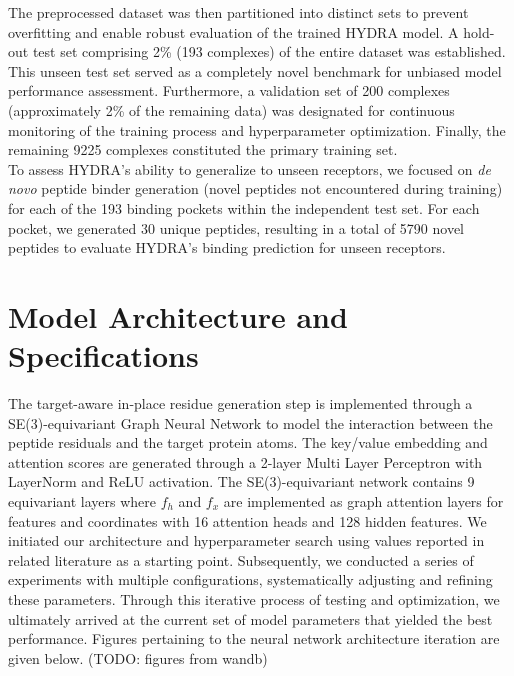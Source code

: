 The preprocessed dataset was then partitioned into distinct sets to prevent overfitting and enable robust evaluation of the trained HYDRA model. A hold-out test set comprising 2\% (193 complexes) of the entire dataset was established. This unseen test set served as a completely novel benchmark for unbiased model performance assessment. Furthermore, a validation set of 200 complexes (approximately 2\% of the remaining data) was designated for continuous monitoring of the training process and hyperparameter optimization. Finally, the remaining 9225 complexes constituted the primary training set. \\

To assess HYDRA's ability to generalize to unseen receptors, we focused on \textit{de novo} peptide binder generation (novel peptides not encountered during training) for each of the 193 binding pockets within the independent test set. For each pocket, we generated 30 unique peptides, resulting in a total of 5790 novel peptides to evaluate HYDRA's binding prediction for unseen receptors.

\section{Model Architecture and Specifications}
The target-aware in-place residue generation step is implemented through a SE(3)-equivariant Graph Neural Network to model the interaction between the peptide residuals and the target protein atoms. The key/value embedding and attention scores are generated through a 2-layer Multi Layer Perceptron with LayerNorm and ReLU activation.
The SE(3)-equivariant network contains 9 equivariant layers where $f_h$ and $f_x$ are implemented as graph attention layers for features and coordinates with 16 attention heads and 128 hidden features. We initiated our architecture and hyperparameter search using values reported in related literature \cite{guan20233d} as a starting point. Subsequently, we conducted a series of experiments with multiple configurations, systematically adjusting and refining these parameters. Through this iterative process of testing and optimization, we ultimately arrived at the current set of model parameters that yielded the best performance. Figures pertaining to the neural network architecture iteration are given below. (TODO: figures from wandb) \\

